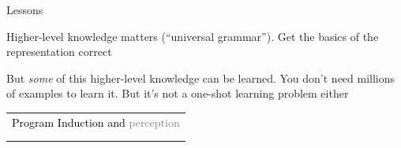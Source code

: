 \documentclass{beamer}
\begin{document}

\begin{frame}{Lessons}

  Higher-level knowledge matters (``universal grammar''). Get the basics of the representation correct

  \vspace{1cm}

  But \emph{some} of this higher-level knowledge can be learned. You don't need millions of examples to learn it. But it's not a one-shot learning problem either

\end{frame}

\begin{frame}{}
  \begin{center}
    \begin{tabular}{l}
      {\textcolor{black}{Program Induction and }\textcolor{gray}{perception}}\\
      \phantom{Program Induction and }{\textcolor{gray}{model discovery}}\\
      \phantom{Program Induction and }{\textcolor{black}{learning to learn}}
      \end{tabular}
  \end{center}
\end{frame}
\end{document}
